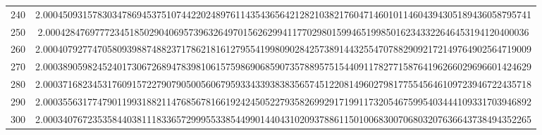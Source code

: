 \documentclass[final]{article}
\begin{document}
\begin{table}
\begin{center}
\begin{tabular}{|c|c|}
			240 & 	2.000450931578303478694537510744220248976114354365642128210382176047146010114604394305189436058795741 \\ 
			250 & 	2.00042847697772345185029040695739632649701562629941177029801599465199850162343322646453194120400036 \\ 
			260 & 	2.000407927747058093988748823717862181612795541998090284257389144325547078829092172149764902564719009 \\ 
			270 & 	2.000389059824524017306726894783981061575986906859073578895751544091178277158764196266029696601424629 \\ 
			280 & 	2.000371682345317609157227907905005606795933433938383565745122081496027981775545646109723946722435718 \\ 
			290 & 	2.000355631774790119931882114768567816619242450522793582699291719911732054675995403444109331703946892 \\ 
			300	&   2.000340767235358440381118336572999553385449901440431020937886115010068300706803207636643738494352265 \\
			\hline
			\hline
		\end{tabular}
	\end{center}
	\bigskip\bigskip
\end{table}
\end{document}
